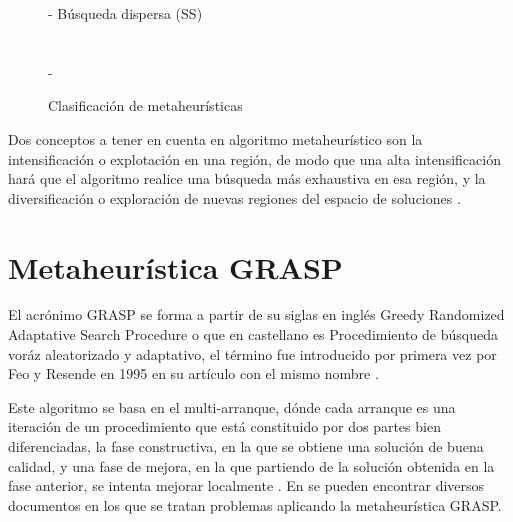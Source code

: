 \begin{figure}[H]
{{{			- Búsqueda dispersa (SS)\\
		}\\
	}\\
	- \\
}
	\caption{Clasificación de metaheurísticas}
	\label{fig:clasif-metahs}
\end{figure}

Dos conceptos a tener en cuenta en algoritmo metaheurístico son la intensificación o explotación en una región, de modo que una alta intensificación hará que el algoritmo realice una búsqueda más exhaustiva en esa región, y la diversificación o exploración de nuevas regiones del espacio de soluciones \cite{libro-metaheuristicas}.

\section{Metaheurística GRASP}
El acrónimo GRASP se forma a partir de su siglas en inglés Greedy Randomized Adaptative Search Procedure o que en castellano es Procedimiento de búsqueda voráz aleatorizado y adaptativo, el término fue introducido por primera vez por Feo y Resende en 1995 en su artículo con el mismo nombre \cite{grasp-feo-resende}.

Este algoritmo se basa en el multi-arranque, dónde cada arranque es una iteración de un procedimiento que está constituido por dos partes bien diferenciadas, la fase constructiva, en la que se obtiene una solución de buena calidad, y una fase de mejora, en la que partiendo de la solución obtenida en la fase anterior, se intenta mejorar localmente \cite{libro-metaheuristicas}. 
En \cite{grasp-flightrecoveryproblem} \cite{grasp-parallel} \cite{grasp-weapon} \cite{grasp-empaquetado} \cite{grasp-ruta} \cite{grasp-vertex} se pueden encontrar diversos documentos en los que se tratan problemas aplicando la metaheurística GRASP.

